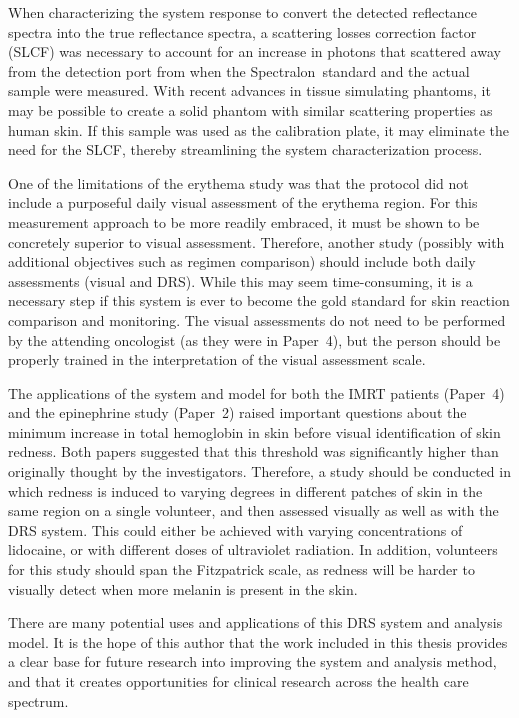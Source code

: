 When characterizing the system response to convert the detected reflectance spectra into the true reflectance spectra, a scattering losses correction factor (SLCF) was necessary to account for an increase in photons that scattered away from the detection port from when the Spectralon\textregistered~standard and the actual sample were measured. With recent advances in tissue simulating phantoms, it may be possible to create a solid phantom with similar scattering properties as human skin. If this sample was used as the calibration plate, it may eliminate the need for the SLCF, thereby streamlining the system characterization process.

One of the limitations of the erythema study was that the protocol did not include a purposeful daily visual assessment of the erythema region. For this measurement approach to be more readily embraced, it must be shown to be concretely superior to visual assessment. Therefore, another study (possibly with additional objectives such as regimen comparison) should include both daily assessments (visual and DRS). While this may seem time-consuming, it is a necessary step if this system is ever to become the gold standard for skin reaction comparison and monitoring. The visual assessments do not need to be performed by the attending oncologist (as they were in Paper~4), but the person should be properly trained in the interpretation of the visual assessment scale.

The applications of the system and model for both the IMRT patients (Paper~4) and the epinephrine study (Paper~2) raised important questions about the minimum increase in total hemoglobin in skin before visual identification of skin redness. Both papers suggested that this threshold was significantly higher than originally thought by the investigators. Therefore, a study should be conducted in which redness is induced to varying degrees in different patches of skin in the same region on a single volunteer, and then assessed visually as well as with the DRS system. This could either be achieved with varying concentrations of lidocaine, or with different doses of ultraviolet radiation.\cite{Diffey1991,Harrison2002} In addition, volunteers for this study should span the Fitzpatrick scale,\cite{Fitzpatrick1988} as redness will be harder to visually detect when more melanin is present in the skin.

There are many potential uses and applications of this DRS system and analysis model. It is the hope of this author that the work included in this thesis provides a clear base for future research into improving the system and analysis method, and that it creates opportunities for clinical research across the health care spectrum.



